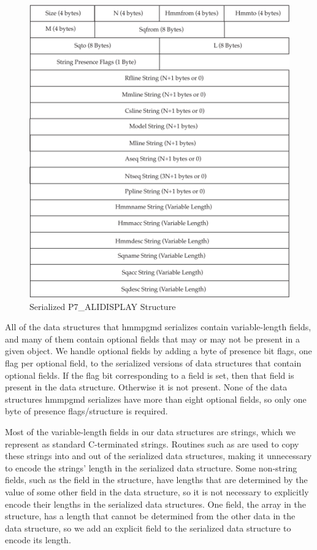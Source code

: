 \documentclass[notoc,justified]{tufte-book}    %
\begin{document}
{\begin{figure}
\includegraphics[width=\textwidth]{inclusions/alidisplay-serialize.pdf}
\caption{Serialized {P7\_ALIDISPLAY} Structure}
\label{fig:alidisplay-serialize}
\end{figure}

All of the data structures that hmmpgmd serializes contain variable-length fields, and many of them contain optional fields that may or may not be present in a given object.  We handle optional fields by adding a byte of presence bit flags, one flag per optional field, to the serialized versions of data structures that contain optional fields.  If the flag bit corresponding to a field is set, then that field is present in the data structure. Otherwise it is not present.  None of the data structures hmmpgmd serializes have more than eight optional fields, so only one byte of presence flags/structure is required.

Most of the variable-length fields in our data structures are strings, which we represent as standard C-terminated strings.  Routines such as  are used to copy these strings into and out of the serialized data structures, making it unnecessary to encode the strings' length in the serialized data structure.  Some non-string fields, such as the  field in the {} structure, have lengths that are determined by the value of some other field in the data structure, so it is not necessary to explicitly encode their lengths in the serialized data structures. One field, the  array in the {} structure, has a length that cannot be determined from the other data in the data structure, so we add an explicit field to the serialized data structure to encode its length.

}
\end{document}
